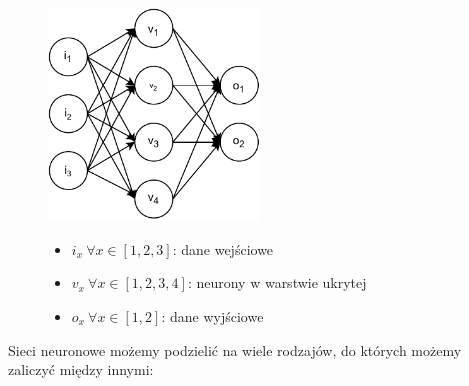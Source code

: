 \begin{figure}[H]
    \centering
    \includegraphics[width=0.5\textwidth]{images/neural-network}
    \begin{itemize}
        \item[] $i_x \ \forall x \in [1, 2, 3]$: dane wejściowe
        \item[] $v_x \ \forall x \in [1, 2, 3, 4]$: neurony w warstwie ukrytej
        \item[] $o_x \ \forall x \in [1, 2]$: dane wyjściowe
    \end{itemize}
    \label{fig:neural-network}
\end{figure}
Sieci neuronowe możemy podzielić na wiele rodzajów, do których możemy zaliczyć między innymi:
